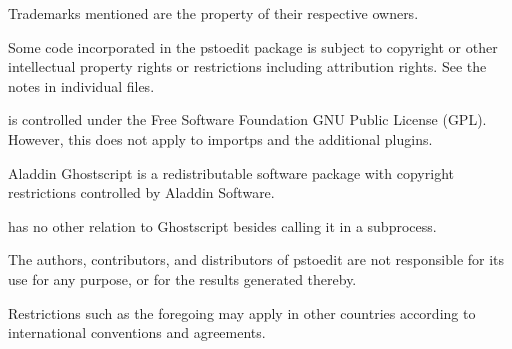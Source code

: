 \documentclass[english,a4paper]{article}
\begin{document}
Trademarks mentioned are the property of their respective owners.

Some code incorporated in the pstoedit package is subject to copyright or
other intellectual property rights or restrictions including attribution
rights. See the notes in individual files.

 is controlled under the Free Software Foundation GNU Public
License (GPL). However, this does not apply to importps and the additional
plugins.

Aladdin Ghostscript is a redistributable software package with copyright
restrictions controlled by Aladdin Software.

 has no other relation to Ghostscript besides calling it in a
subprocess.

The authors, contributors, and distributors of pstoedit are not responsible
for its use for any purpose, or for the results generated thereby.

Restrictions such as the foregoing may apply in other countries according to
international conventions and agreements.


\LatexManEnd
\end{document}
